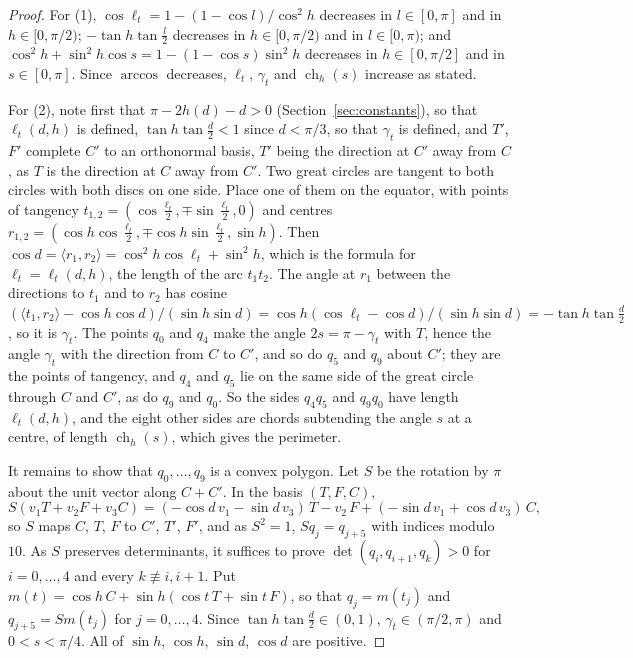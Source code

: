 \documentclass[12pt]{amsart}
\theoremstyle{definition}
\theoremstyle{plain}
\theoremstyle{definition}
\begin{document}
\begin{proof}
For (1), $\cos \ell_t=1-(1-\cos l)/\cos^2h$ decreases in $l\in[0,\pi]$ and in $h\in[0,\pi/2)$; $-\tan h\tan\frac l2$ decreases in $h\in[0,\pi/2)$ and in $l\in[0,\pi)$; and $\cos^2h+\sin^2h\cos s=1-(1-\cos s)\sin^2h$ decreases in $h\in[0,\pi/2]$ and in $s\in[0,\pi]$. Since $\arccos$ decreases, $\ell_t$, $\gamma_t$ and $\operatorname{ch}_h(s)$ increase as stated.

For (2), note first that $\pi-2h(d)-d>0$ (Section~\ref{sec:constants}), so that $\ell_t(d,h)$ is defined, $\tan h\tan\frac d2<1$ since $d<\pi/3$, so that $\gamma_t$ is defined, and $T'$, $F'$ complete $C'$ to an orthonormal basis, $T'$ being the direction at $C'$ away from $C$, as $T$ is the direction at $C$ away from $C'$. Two great circles are tangent to both circles with both discs on one side. Place one of them on the equator, with points of tangency $t_{1,2}=(\cos\frac{\ell_t}2,\mp\sin\frac{\ell_t}2,0)$ and centres $r_{1,2}=(\cos h\cos\frac{\ell_t}2,\mp\cos h\sin\frac{\ell_t}2,\sin h)$. Then $\cos d=\langle r_1,r_2\rangle=\cos^2h\cos\ell_t+\sin^2h$, which is the formula for $\ell_t=\ell_t(d,h)$, the length of the arc $t_1t_2$. The angle at $r_1$ between the directions to $t_1$ and to $r_2$ has cosine $(\langle t_1,r_2\rangle-\cos h\cos d)/(\sin h\sin d)=\cos h(\cos\ell_t-\cos d)/(\sin h\sin d)=-\tan h\tan\frac d2$, so it is $\gamma_t$. The points $q_0$ and $q_4$ make the angle $2s=\pi-\gamma_t$ with $T$, hence the angle $\gamma_t$ with the direction from $C$ to $C'$, and so do $q_5$ and $q_9$ about $C'$; they are the points of tangency, and $q_4$ and $q_5$ lie on the same side of the great circle through $C$ and $C'$, as do $q_9$ and $q_0$. So the sides $q_4q_5$ and $q_9q_0$ have length $\ell_t(d,h)$, and the eight other sides are chords subtending the angle $s$ at a centre, of length $\operatorname{ch}_h(s)$, which gives the perimeter.

It remains to show that $q_0,\dots,q_9$ is a convex polygon. Let $S$ be the rotation by $\pi$ about the unit vector along $C+C'$. In the basis $(T,F,C)$,
\[
S(v_1T+v_2F+v_3C)=(-\cos d\,v_1-\sin d\,v_3)\,T-v_2\,F+(-\sin d\,v_1+\cos d\,v_3)\,C ,
\]
so $S$ maps $C$, $T$, $F$ to $C'$, $T'$, $F'$, and as $S^2=1$, $Sq_j=q_{j+5}$ with indices modulo $10$. As $S$ preserves determinants, it suffices to prove $\det(q_i,q_{i+1},q_k)>0$ for $i=0,\dots,4$ and every $k\not\equiv i,i+1$. Put $m(t)=\cos h\,C+\sin h(\cos t\,T+\sin t\,F)$, so that $q_j=m(t_j)$ and $q_{j+5}=Sm(t_j)$ for $j=0,\dots,4$. Since $\tan h\tan\frac d2\in(0,1)$, $\gamma_t\in(\pi/2,\pi)$ and $0<s<\pi/4$. All of $\sin h$, $\cos h$, $\sin d$, $\cos d$ are positive.


\end{proof}
\end{document}
